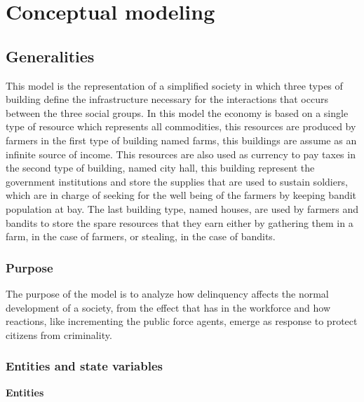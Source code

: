 \documentclass{wscpaperproc}
\begin{document}
\section{Conceptual modeling}

\subsection{Generalities}

This model is the representation of a simplified society in which three types
of building define the infrastructure necessary for the interactions that occurs
between the three social groups. In this model the
economy is based on a single type of resource which represents all commodities,
this resources are produced by farmers in the first type of building named
farms, this buildings are assume as an infinite source of income. This
resources are also used as currency to pay taxes in the second type of
building, named city hall, this building represent the government
institutions and store the supplies that are used to sustain soldiers,
which are in charge of seeking for the well being of the farmers by
keeping bandit population at bay. The last building type, named houses,
are used by farmers and bandits to store the spare resources that they
earn either by gathering them in a farm, in the case of farmers, or
stealing, in the case of bandits.

\subsubsection{Purpose}

The purpose of the model is to analyze how delinquency affects the normal
development of a society, from the effect that has in the workforce and how
reactions, like incrementing the public force agents, emerge as response to
protect citizens from criminality.

\subsubsection{Entities and state variables}
\noindent \textbf{Entities}
\end{document}
